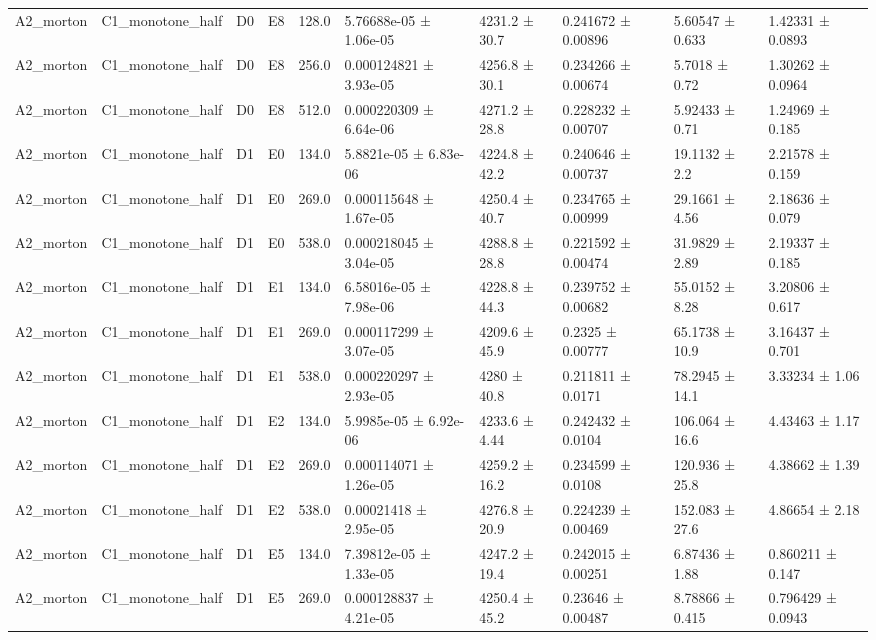 \begin{table}
\begin{tabular}{llllllllll}
A2\_morton & C1\_monotone\_half & D0 & E8 & 128.0 & 5.76688e-05 ± 1.06e-05 & 4231.2 ± 30.7 & 0.241672 ± 0.00896 & 5.60547 ± 0.633 & 1.42331 ± 0.0893 \\
A2\_morton & C1\_monotone\_half & D0 & E8 & 256.0 & 0.000124821 ± 3.93e-05 & 4256.8 ± 30.1 & 0.234266 ± 0.00674 & 5.7018 ± 0.72 & 1.30262 ± 0.0964 \\
A2\_morton & C1\_monotone\_half & D0 & E8 & 512.0 & 0.000220309 ± 6.64e-06 & 4271.2 ± 28.8 & 0.228232 ± 0.00707 & 5.92433 ± 0.71 & 1.24969 ± 0.185 \\
A2\_morton & C1\_monotone\_half & D1 & E0 & 134.0 & 5.8821e-05 ± 6.83e-06 & 4224.8 ± 42.2 & 0.240646 ± 0.00737 & 19.1132 ± 2.2 & 2.21578 ± 0.159 \\
A2\_morton & C1\_monotone\_half & D1 & E0 & 269.0 & 0.000115648 ± 1.67e-05 & 4250.4 ± 40.7 & 0.234765 ± 0.00999 & 29.1661 ± 4.56 & 2.18636 ± 0.079 \\
A2\_morton & C1\_monotone\_half & D1 & E0 & 538.0 & 0.000218045 ± 3.04e-05 & 4288.8 ± 28.8 & 0.221592 ± 0.00474 & 31.9829 ± 2.89 & 2.19337 ± 0.185 \\
A2\_morton & C1\_monotone\_half & D1 & E1 & 134.0 & 6.58016e-05 ± 7.98e-06 & 4228.8 ± 44.3 & 0.239752 ± 0.00682 & 55.0152 ± 8.28 & 3.20806 ± 0.617 \\
A2\_morton & C1\_monotone\_half & D1 & E1 & 269.0 & 0.000117299 ± 3.07e-05 & 4209.6 ± 45.9 & 0.2325 ± 0.00777 & 65.1738 ± 10.9 & 3.16437 ± 0.701 \\
A2\_morton & C1\_monotone\_half & D1 & E1 & 538.0 & 0.000220297 ± 2.93e-05 & 4280 ± 40.8 & 0.211811 ± 0.0171 & 78.2945 ± 14.1 & 3.33234 ± 1.06 \\
A2\_morton & C1\_monotone\_half & D1 & E2 & 134.0 & 5.9985e-05 ± 6.92e-06 & 4233.6 ± 4.44 & 0.242432 ± 0.0104 & 106.064 ± 16.6 & 4.43463 ± 1.17 \\
A2\_morton & C1\_monotone\_half & D1 & E2 & 269.0 & 0.000114071 ± 1.26e-05 & 4259.2 ± 16.2 & 0.234599 ± 0.0108 & 120.936 ± 25.8 & 4.38662 ± 1.39 \\
A2\_morton & C1\_monotone\_half & D1 & E2 & 538.0 & 0.00021418 ± 2.95e-05 & 4276.8 ± 20.9 & 0.224239 ± 0.00469 & 152.083 ± 27.6 & 4.86654 ± 2.18 \\
A2\_morton & C1\_monotone\_half & D1 & E5 & 134.0 & 7.39812e-05 ± 1.33e-05 & 4247.2 ± 19.4 & 0.242015 ± 0.00251 & 6.87436 ± 1.88 & 0.860211 ± 0.147 \\
A2\_morton & C1\_monotone\_half & D1 & E5 & 269.0 & 0.000128837 ± 4.21e-05 & 4250.4 ± 45.2 & 0.23646 ± 0.00487 & 8.78866 ± 0.415 & 0.796429 ± 0.0943 \\

\end{tabular}
\end{table}
